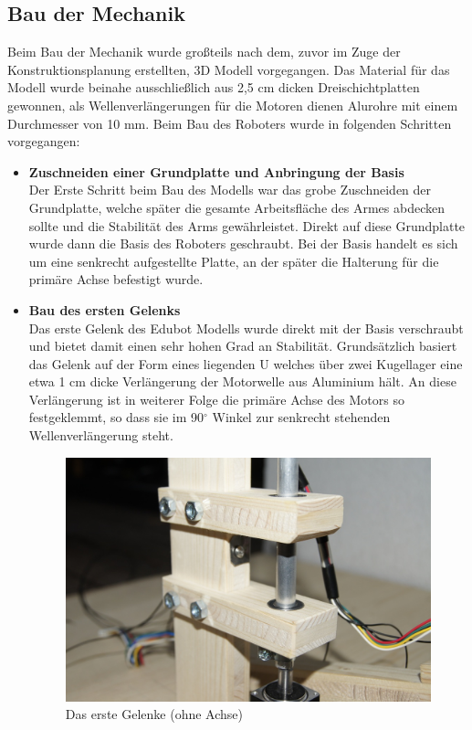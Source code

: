 \subsection{Bau der Mechanik}
Beim Bau der Mechanik wurde großteils nach dem, zuvor im Zuge der Konstruktionsplanung erstellten, 3D Modell vorgegangen. Das Material für das Modell wurde beinahe ausschließlich aus 2,5 cm dicken Dreischichtplatten gewonnen, als Wellenverlängerungen für die Motoren dienen Alurohre mit einem Durchmesser von 10 mm. 
Beim Bau des Roboters wurde in folgenden Schritten vorgegangen:
\begin{itemize}
\item \textbf{Zuschneiden einer Grundplatte und Anbringung der Basis}\\
Der Erste Schritt beim Bau des Modells war das grobe Zuschneiden der Grundplatte, welche später die gesamte Arbeitsfläche des Armes abdecken sollte und die Stabilität des Arms gewährleistet.
Direkt auf diese Grundplatte wurde dann die Basis des Roboters geschraubt. Bei der Basis handelt es sich um eine senkrecht aufgestellte Platte, an der später die Halterung für die primäre Achse befestigt wurde.

\item \textbf{Bau des ersten Gelenks}\\
Das erste Gelenk des  Edubot Modells wurde direkt mit der Basis verschraubt und bietet damit einen sehr hohen Grad an Stabilität. Grundsätzlich basiert das Gelenk auf der Form eines liegenden U welches über zwei Kugellager eine etwa 1 cm dicke Verlängerung der Motorwelle aus Aluminium hält. An diese Verlängerung ist in weiterer Folge die primäre Achse des Motors so festgeklemmt, so dass sie im 90$^\circ$ Winkel zur senkrecht stehenden Wellenverlängerung steht.

\begin{figure}[H]
\centering
\includegraphics[width=11cm]{images/gelenk_photo}
\caption{Das erste Gelenke (ohne Achse)}
\end{figure}


\end{itemize}
